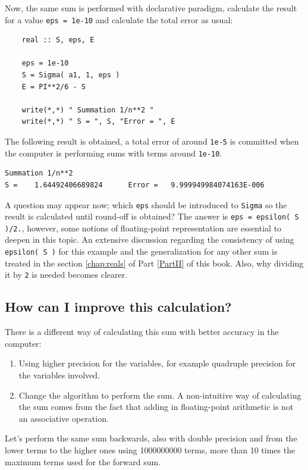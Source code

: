 Now, the same sum is performed with declarative paradigm, 
calculate the result for a value \texttt{eps = 1e-10} 
and calculate the total error as usual:
\begin{verbatim} 
    real :: S, eps, E
    
    eps = 1e-10
    S = Sigma( a1, 1, eps )
    E = PI**2/6 - S
    
    write(*,*) " Summation 1/n**2 "
    write(*,*) " S = ", S, "Error = ", E    
\end{verbatim}

The following result is obtained, a total error of around \texttt{1e-5} is committed
when the computer is performing sums with terms around \texttt{1e-10}.  

\begin{verbatim} 
Summation 1/n**2
S =    1.64492406689824      Error =   9.999949984074163E-006
\end{verbatim}

A question may appear now; which \texttt{eps} should be introduced to \texttt{Sigma} so the result is calculated until round-off is obtained?
The answer is \texttt{eps = epsilon( S )/2.}, however, some notions of floating-point representation are essential to deepen in this topic.
An extensive discussion regarding the consistency of using \texttt{epsilon( S )} for this example and the generalization for any other sum 
is treated in the section \ref{chap:reals} of Part \ref{PartII} of this book. Also, why dividing it by \texttt{2} is needed becomes clearer. 




 
    \subsection{How can I improve this calculation?}
    
There is a different way of calculating this sum with better accuracy in the computer:
\begin{enumerate}
    \item Using higher precision for the variables, for example quadruple precision for the variables involved. 
    \item Change the algorithm to perform the sum. A non-intuitive way of calculating the sum comes from the fact
    that adding in floating-point arithmetic is not an associative operation. 
\end{enumerate}

Let's perform the same sum backwards, also with double precision and from the lower terms to the higher ones using 1000000000 terms, more than 10 times the maximum terms
used for the forward sum. 

